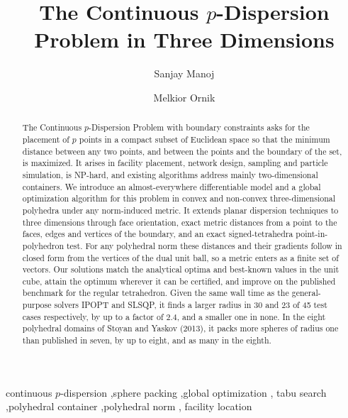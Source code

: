 \documentclass[preprint,12pt]{elsarticle}
\theoremstyle{remark}
\begin{document}
\begin{frontmatter}

  \title{The Continuous \texorpdfstring{$p$}{p}-Dispersion Problem in
  Three Dimensions}

  \author[uiuc]{Sanjay Manoj}
  \author[uiuc]{Melkior Ornik}

  \begin{abstract}
    The Continuous $p$-Dispersion Problem with boundary constraints asks for the
    placement of $p$ points in a compact subset of Euclidean space so that the
    minimum distance between any two points, and between the points and the
    boundary of the set, is maximized. It arises in facility placement, network
    design, sampling and particle simulation, is NP-hard, and existing
    algorithms address mainly two-dimensional containers. We introduce an
    almost-everywhere differentiable model and a global optimization algorithm
    for this problem in convex and non-convex three-dimensional polyhedra under
    any norm-induced metric. It extends planar dispersion techniques to three
    dimensions through face orientation, exact metric distances from a point to
    the faces, edges and vertices of the boundary, and an exact
    signed-tetrahedra point-in-polyhedron test. For any polyhedral norm these
    distances and their gradients follow in closed form from the vertices of the
    dual unit ball, so a metric enters as a finite set of vectors. Our solutions
    match the analytical optima and best-known values in the unit cube, attain
    the optimum wherever it can be certified, and improve on the published
    benchmark for the regular tetrahedron. Given the same wall time as the
    general-purpose solvers IPOPT and SLSQP, it finds a larger radius in 30 and
    23 of 45 test cases respectively, by up to a factor of $2.4$, and a smaller
    one in none. In the eight polyhedral domains of Stoyan and Yaskov (2013), it
    packs more spheres of radius one than published in seven, by up to eight,
    and as many in the eighth.
  \end{abstract}

  \begin{keyword}
    continuous $p$-dispersion \sep sphere packing \sep global optimization \sep
    tabu search \sep polyhedral container \sep polyhedral norm \sep
    facility location
  \end{keyword}

\end{frontmatter}
\end{document}
